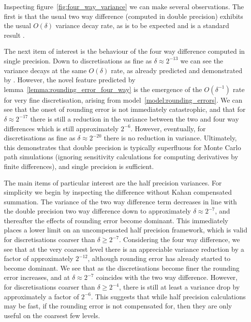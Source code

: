 \documentclass[9pt,a4paper,english]{extarticle}
\begin{document}
Inspecting figure~\ref{fig:four_way_variance} we can make several observations. The first is that the usual two way difference (computed in double precision) exhibits the usual $ O(\delta) $ variance decay rate, as is to be expected and is a standard result \citep{kloeden1999numerical,glasserman2013monte}. 

The next item of interest is the behaviour of the four way difference computed in single precision. Down to discretisations as fine as $ \delta \approx 2^{-13} $ we can see the variance decays at the same $ O(\delta) $ rate, as already predicted and demonstrated by \citet[4.1]{giles2020approximating}. However, the novel feature predicted by lemma~\ref{lemma:rounding_error_four_way} is the emergence of the $ O(\delta^{-1}) $ rate  for very fine discretisation, arising from model~\ref{model:rounding_errors}. We can see that the onset of rounding error is not immediately catastrophic, and that for $ \delta \approx 2^{-17} $ there is still a reduction in the variance between the two and four way differences which is still approximately $ 2^{-6} $. However, eventually, for discretisations as fine as $ \delta \approx 2^{-20} $ there is no reduction in variance. Ultimately, this demonstrates that double precision is typically superfluous for Monte Carlo path simulations (ignoring sensitivity calculations for computing derivatives by finite differences), and single precision is sufficient. 

The main items of particular interest are the half precision variances. For simplicity we begin by inspecting the difference without Kahan compensated summation. The variance of the two way difference term decreases in line with the double precision two way difference down to approximately $ \delta \approx 2^{-7} $, and thereafter the effects of rounding error become dominant. This immediately places a lower limit on an uncompensated half precision framework, which is valid for discretisations coarser than $ \delta \geq 2^{-7} $. Considering the four way difference, we see that at the very coarsest level there is an appreciable variance reduction by a factor of approximately $ 2^{-12} $, although rounding error has already started to become dominant. We see that as the discretisations become finer the rounding error increases, and at $ \delta \approx 2^{-7} $ coincides with the two way difference. However, for discretisations coarser than $ \delta \geq 2^{-4} $, there is still at least a variance drop by approximately a factor of $ 2^{-6} $. This suggests that while half precision calculations may be fast, if the rounding error is not compensated for, then they are only useful on the coarsest few levels. 
\end{document}
